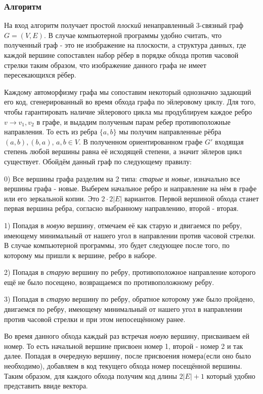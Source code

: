\subsubsection*{Алгоритм}
На вход алгоритм получает простой \textit{плоский} ненаправленный 3-связный граф $G=(V, E)$. В случае компьютерной программы удобно считать, что полученный граф - это не изображение на плоскости, а структура данных, где каждой вершине сопоставлен набор рёбер в порядке обхода против часовой стрелки таким образом, что изображение данного графа не имеет пересекающихся рёбер. 

Каждому автоморфизму графа мы сопоставим некоторый однозначно задающий его код, сгенерированный во время обхода графа по эйлеровому циклу. Для того, чтобы гарантировать наличие эйлерового цикла мы продублируем каждое ребро $v \rightarrow v_1, v_2$ в графе, и выдадим полученым парам ребер противоположные направления. То есть из ребра $\{a, b\}$ мы получим направленные рёбра $(a, b), (b, a)$, $a, b \in V$. В полученном ориентированном графе $G'$ входящая степень любой вершины равна её исходящей степени, а значит эйлеров цикл существует. Обойдём данный граф по следующему правилу:

    0) Все вершины графа разделим на 2 типа: \textit{старые} и \textit{новые}, изначально все вершины графа - новые. Выберем начальное ребро и направление на нём в графе или его зеркальной копии. Это $2 \cdot 2|E|$ вариантов. Первой вершиной обхода станет первая вершина ребра, согласно выбранному направлению, второй - вторая.
    
    1) Попадая в \textit{новую} вершину, отмечаем её как старую и двигаемся по ребру, имеющему минимальный от нашего угол в направлении против часовой стрелки. В случае компьютерной программы, это будет следующее после того, по которому мы пришли к вершине, ребро в наборе.

    2) Попадая в \textit{старую} вершину по ребру, противоположное направление которого ещё не было посещено, возвращаемся по противоположному ребру.

    3) Попадая в \textit{старую} вершину по ребру, обратное которому уже было пройдено, двигаемся по ребру, имеющему минимальный от нашего угол в направлении против часовой стрелки и при этом непосещённому ранее.

Во время данного обхода каждый раз встречая \textit{новую} вершину, присваиваем ей номер. То есть начальной вершине присвоен номер 1, второй - номер 2 и так далее. Попадая в очередную вершину, после присвоения номера(если оно было необходимо), добавляем в код текущего обхода номер посещённой вершины. Таким образом, для каждого обхода получим код длины $2|E| + 1$ который удобно представить ввиде вектора.

